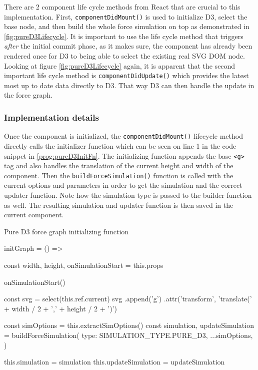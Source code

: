 There are 2 component life cycle methods from React that are crucial to this implementation. First, \texttt{componentDidMount()} is used to initialize D3, select the base node, and then build the whole force simulation on top as demonstrated in \ref{fig:pureD3Lifecycle}. It is important to use the life cycle method that triggers \emph{after} the initial commit phase, as it makes sure, the component has already been rendered once for D3 to being able to select the existing real SVG DOM node. Looking at figure \ref{fig:pureD3Lifecycle} again, it is apparent that the second important life cycle method is \texttt{componentDidUpdate()} which provides the latest most up to date data directly to D3. That way D3 can then handle the update in the force graph.

\subsubsection{Implementation details}

Once the component is initialized, the \texttt{componentDidMount()} lifecycle method directly calls the initializer function which can be seen on line 1 in the code snippet in \ref{prog:pureD3InitFn}. The initializing function appends the base \texttt{<g>} tag and also handles the translation of the current height and width of the component. Then the \texttt{buildForceSimulation()} function is called with the current options and parameters in order to get the simulation and the correct updater function. Note how the simulation type is passed to the builder function as well. The resulting simulation and updater function is then saved in the current component.

\begin{program}[H]
\caption{Pure D3 force graph initializing function}
\label{prog:pureD3InitFn}
\begin{JsCode}
initGraph = () => {
  const { width, height, onSimulationStart } = this.props

  onSimulationStart()

  const svg = select(this.ref.current)
  svg
    .append('g')
    .attr('transform', 'translate(' + width / 2 + ',' + height / 2 + ')')

  const simOptions = this.extractSimOptions()
  const { simulation, updateSimulation } = buildForceSimulation({
    type: SIMULATION_TYPE.PURE_D3,
    ...simOptions,
  })

  this.simulation = simulation
  this.updateSimulation = updateSimulation
}
\end{JsCode}
\end{program}

